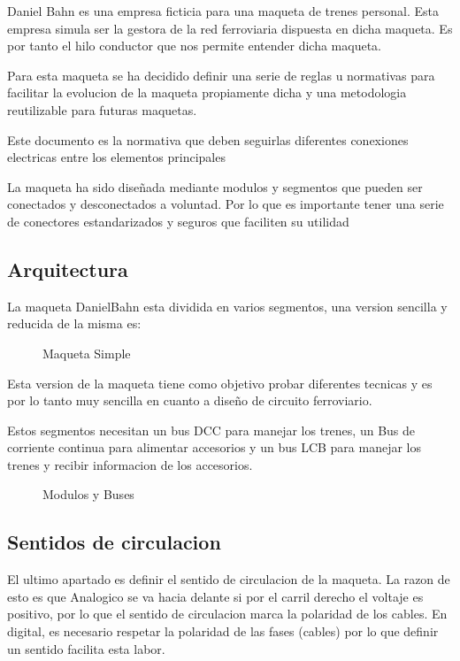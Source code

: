 Daniel Bahn es una empresa ficticia para una maqueta de trenes personal. Esta empresa simula ser la gestora de la red ferroviaria dispuesta en dicha maqueta.
Es por tanto el hilo conductor que nos permite entender dicha maqueta.

Para esta maqueta se ha decidido definir una serie de reglas u normativas para facilitar la evolucion de la maqueta propiamente dicha y una metodologia
reutilizable para futuras maquetas.

Este documento es la normativa que deben seguirlas diferentes conexiones electricas entre los elementos principales

La maqueta ha sido diseñada mediante modulos y segmentos que pueden ser conectados y desconectados a voluntad.
Por lo que es importante tener una serie de conectores estandarizados y seguros que faciliten su utilidad

\subsection{Arquitectura}
La maqueta DanielBahn esta dividida en varios segmentos, una version sencilla y reducida
 de la misma es:

\begin{figure}[H]
    \centering
    
    \caption{Maqueta Simple}
    \label{fig:MaquetaSimple}
\end{figure}

Esta version de la maqueta tiene como objetivo probar diferentes tecnicas
y es por lo tanto muy sencilla en cuanto a diseño de circuito ferroviario.

Estos segmentos necesitan un bus DCC para manejar los trenes, un Bus de corriente
continua para alimentar accesorios y un bus LCB para 
manejar los trenes y recibir informacion de los accesorios.

\begin{figure}[H]
    \centering
    
    \caption{Modulos y Buses}
    \label{fig:ModulosBuses}
\end{figure}

\subsection{Sentidos de circulacion}

El ultimo apartado es definir el sentido de circulacion de la maqueta.
La razon de esto es que Analogico se va hacia delante si por el carril derecho
el voltaje es positivo, por lo que el sentido de circulacion marca la polaridad
de los cables. En digital, es necesario respetar la polaridad de las fases (cables)
por lo que definir un sentido facilita esta labor.


